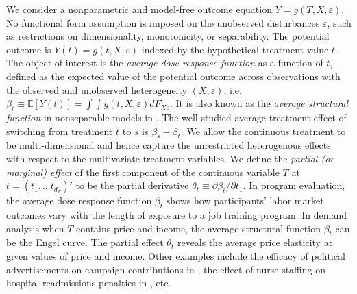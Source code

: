 \documentclass[lettersize, 12pt]{article}
\begin{document}
We consider a nonparametric and model-free outcome equation $Y = g(T, X, \varepsilon)$.
No functional form assumption is imposed on the unobserved disturbances $\varepsilon$, such as restrictions on dimensionality, monotonicity, or separability.
The potential outcome is $Y(t) = g(t,X,\varepsilon)$ indexed by the hypothetical treatment value $t$.
The object of interest is the {\it average dose-response function} as a function of $t$, defined as the expected value of the potential outcome across observations with the observed and unobserved heterogeneity $(X, \varepsilon)$, i.e.\ 
$\beta_t \equiv \mathbb{E}[Y(t)] = \int\int g(t, X, \varepsilon) dF_{X\varepsilon}$.
It is also known as the {\it average structural function} in nonseparable models in \cite{BP03}.
The well-studied average treatment effect of switching from treatment $t$ to $s$ is $\beta_{s} - \beta_{t}$.
We allow the continuous treatment to be multi-dimensional and hence capture the unrestricted heterogenous effects with respect to the multivariate treatment variables.
We define the {\it partial (or marginal) effect} of the first component of the continuous variable $T$ at $t = (t_1,... t_{d_T})'$ to be the partial derivative $\theta_t \equiv \partial \beta_t/ \partial t_1$.
In program evaluation, the average dose response function $\beta_t$ shows how participants' labor market outcomes vary with the length of exposure to a job training program.
In demand analysis when $T$ contains price and income, the average structural function $\beta_t$ can be the Engel curve. 
The partial effect $\theta_t$ reveals the average price elasticity at given values of price and income.
Other examples include the efficacy of political advertisements on campaign contributions in \cite{Fong},
the effect of nurse staffing on hospital readmissions penalties in \cite{Kennedy}, etc.
\end{document}
